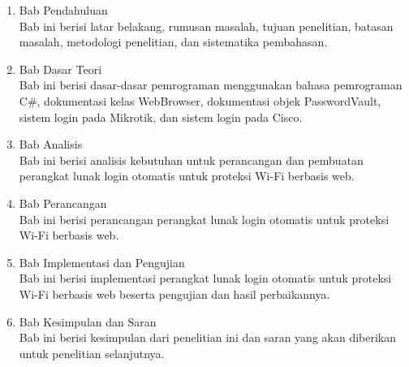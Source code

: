 \begin{enumerate}
    \item{Bab Pendahuluan \\ Bab ini berisi latar belakang, rumusan masalah, tujuan penelitian, batasan masalah, metodologi penelitian, dan sistematika pembahasan.}
    \item{Bab Dasar Teori \\ Bab ini berisi dasar-dasar pemrograman menggunakan bahasa pemrograman C\#, dokumentasi kelas WebBrowser, dokumentasi objek PasswordVault, sistem login pada Mikrotik, dan sistem login pada Cisco.}
    \item{Bab Analisis \\ Bab ini berisi analisis kebutuhan untuk perancangan dan pembuatan perangkat lunak login otomatis untuk proteksi Wi-Fi berbasis web.}
    \item{Bab Perancangan \\ Bab ini berisi perancangan perangkat lunak login otomatis untuk proteksi Wi-Fi berbasis web.}
    \item{Bab Implementasi dan Pengujian \\ Bab ini berisi implementasi perangkat lunak login otomatis untuk proteksi Wi-Fi berbasis web beserta pengujian dan hasil perbaikannya.}
    \item{Bab Kesimpulan dan Saran \\ Bab ini berisi kesimpulan dari penelitian ini dan saran yang akan diberikan untuk penelitian selanjutnya.}
\end{enumerate}
